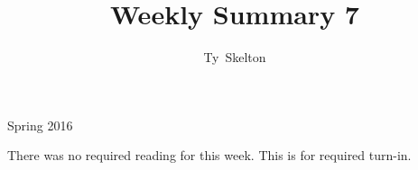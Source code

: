 \documentclass[10pt,draftclsnofoot,onecolumn]{IEEEtran}
\begin{document}
\singlespacing
\title{Weekly Summary 7}

\author{Ty~Skelton}

{Spring 2016}

\maketitle
\IEEEpeerreviewmaketitle

There was no required reading for this week.
This is for required turn-in.

\end{document}
